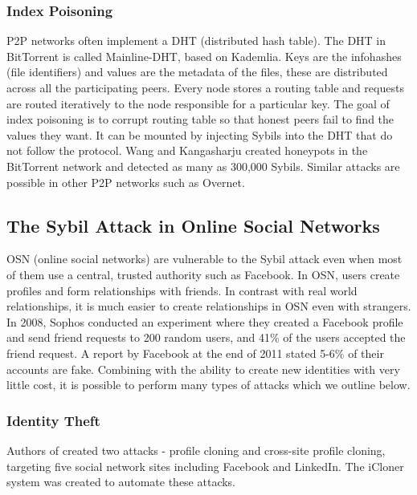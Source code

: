 \subsubsection{Index Poisoning}
P2P networks often implement a DHT (distributed hash table). The DHT in
BitTorrent is called Mainline-DHT, based on
Kademlia\cite{maymounkov2002kademlia}. Keys are the infohashes (file
identifiers) and values are the metadata of the files, these are distributed
across all the participating peers. Every node stores a routing table and
requests are routed iteratively to the node responsible for a particular
key\cite{bep5}. The goal of index poisoning is to corrupt routing table so that
honest peers fail to find the values they want. It can be mounted by injecting
Sybils into the DHT that do not follow the protocol. Wang and Kangasharju
created honeypots in the BitTorrent network and detected as many as 300,000
Sybils\cite{wang2012real}. Similar attacks are possible in other P2P networks
such as Overnet\cite{liang2006index}.


% 

\subsection{The Sybil Attack in Online Social Networks}
OSN (online social networks) are vulnerable to the Sybil attack even when most
of them use a central, trusted authority such as Facebook. In OSN, users create
profiles and form relationships with friends. In contrast with real world
relationships, it is much easier to create relationships in OSN even with
strangers. In 2008, Sophos conducted an experiment where they created a Facebook
profile and send friend requests to 200 random users, and 41\% of the users
accepted the friend request\cite{sophos}. A report by Facebook at the end of
2011 stated 5-6\% of their accounts are fake\cite{facebookfake}. Combining with
the ability to create new identities with very little cost, it is possible to
perform many types of attacks which we outline below.

\subsubsection{Identity Theft}
Authors of \cite{bilge2009all} created two attacks - profile cloning and
cross-site profile cloning, targeting five social network sites including
Facebook and LinkedIn. The iCloner system was created to automate these
attacks.

